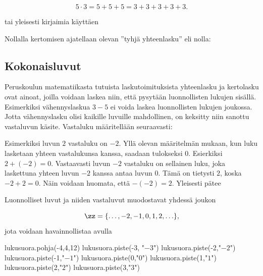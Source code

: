 \[5 \cdot 3 = 5 + 5 + 5 = 3 + 3 + 3 + 3 + 3.\]

tai yleisesti kirjaimia käyttäen

\laatikko{ \[m \cdot n = \underbrace{m + m + \ldots + m}_{n\text{ kpl}} = \underbrace{n + n + \ldots + n}_{m\text{ kpl}}.\] }

Nollalla kertomisen ajatellaan olevan ''tyhjä yhteenlasku'' eli nolla:
\laatikko{ \[0 \cdot m = 0\] }


\subsection*{Kokonaisluvut}

Peruskoulun matematiikasta tutuista laskutoimituksista yhteenlasku ja kertolasku ovat ainoat,
joilla voidaan laskea niin, että pysytään luonnollisten lukujen sisällä. Esimerkiksi vähennyslaskua
$3-5$ ei voida laskea luonnollisten lukujen joukossa. Jotta vähennyslasku olisi kaikille luvuille
mahdollinen, on keksitty niin sanottu vastaluvun käsite. Vastaluku määritellään seuraavasti:


Esimerkiksi luvun $2$ vastaluku on $-2$. Yllä olevan määritelmän mukaan, kun luku lasketaan yhteen vastalukunsa kanssa, saadaan tulokseksi $0$.
Esierkiksi $2+(-2)=0$. Vastaavasti luvun $-2$ vastaluku on sellainen luku, joka laskettuna yhteen luvun $-2$ kanssa antaa luvun $0$.
Tämä on tietysti $2$, koska $-2+2=0$. Näin voidaan huomata, että $-(-2)=2$. Yleisesti pätee


Luonnolliset luvut ja niiden vastaluvut muodostavat yhdessä  joukon

\[\zz = \{\ldots, -2, -1, 0, 1, 2, \ldots\},\] jota voidaan havainnollistaa  avulla

\begin{kuva}
	lukusuora.pohja(-4,4,12)
	lukusuora.piste(-3, "$-3$")
	lukusuora.piste(-2,"$-2$")
	lukusuora.piste(-1,"$-1$")
	lukusuora.piste(0,"$0$")
	lukusuora.piste(1,"$1$")
	lukusuora.piste(2,"$2$")
	lukusuora.piste(3,"$3$")
\end{kuva}


